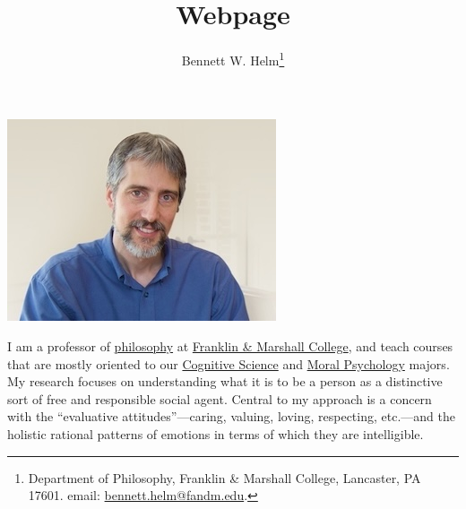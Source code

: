 \documentclass[11pt]{article}
\begin{document}

\ifx\HCode\undefined
  \title{Webpage}
  \author{Bennett W. Helm\footnote{Department of Philosophy, Franklin \& Marshall College, Lancaster, PA 17601. email: \href{mailto:bennett.helm@fandm.edu}{bennett.helm@fandm.edu}.}}
  \date{}
  \maketitle
\fi

\tableofcontents

\ifdefined\HCode

\fi

\section[About]{}

\begin{center}
  \includegraphics{Helm.jpg}
\end{center}

I am a professor of \href{https://www.fandm.edu/fields-of-study/philosophy/index.html}{philosophy} at \href{https://www.fandm.edu}{Franklin \& {} Marshall College}, and teach courses that are mostly oriented to our \href{https://www.fandm.edu/fields-of-study/cognitive-science/index.html}{Cognitive Science} and \href{https://www.fandm.edu/fields-of-study/moral-psychology/index.html}{Moral Psychology} majors. My research focuses on understanding what it is to be a person as a distinctive sort of free and responsible social agent. Central to my approach is a concern with the \enquote{evaluative attitudes}---caring, valuing, loving, respecting, etc.---and the holistic rational patterns of emotions in terms of which they are intelligible.
\end{document}
